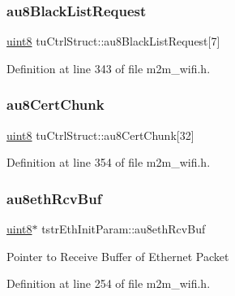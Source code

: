 \subsubsection{\texorpdfstring{au8\+Black\+List\+Request}{au8BlackListRequest}}
{\footnotesize\ttfamily \hyperlink{group__DataT_ga4df709a77647e870bbf1d955b8edc9a6}{uint8} tu\+Ctrl\+Struct\+::au8\+Black\+List\+Request\mbox{[}7\mbox{]}}



Definition at line 343 of file m2m\+\_\+wifi.\+h.

\mbox{\label{group__WifiSetCustInfoElementFn_gade8c3edfe384c40d854409e4b77576e4}} 
\subsubsection{\texorpdfstring{au8\+Cert\+Chunk}{au8CertChunk}}
{\footnotesize\ttfamily \hyperlink{group__DataT_ga4df709a77647e870bbf1d955b8edc9a6}{uint8} tu\+Ctrl\+Struct\+::au8\+Cert\+Chunk\mbox{[}32\mbox{]}}



Definition at line 354 of file m2m\+\_\+wifi.\+h.

\mbox{\label{group__WifiSetCustInfoElementFn_gaa0328252052cf33e1ca7c695e238a067}} 
\subsubsection{\texorpdfstring{au8eth\+Rcv\+Buf}{au8ethRcvBuf}}
{\footnotesize\ttfamily \hyperlink{group__DataT_ga4df709a77647e870bbf1d955b8edc9a6}{uint8}$\ast$ tstr\+Eth\+Init\+Param\+::au8eth\+Rcv\+Buf}

Pointer to Receive Buffer of Ethernet Packet 

Definition at line 254 of file m2m\+\_\+wifi.\+h.

